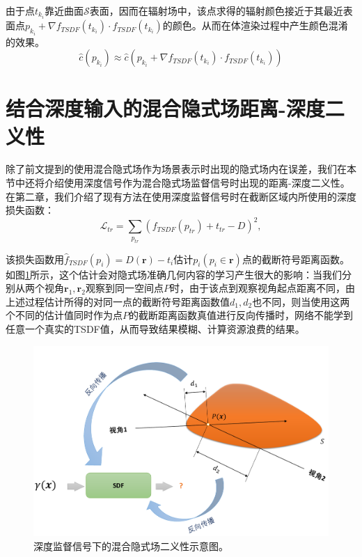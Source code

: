由于点$t_{k_i}$靠近曲面$\mathcal{S}$表面，因而在辐射场中，该点求得的辐射颜色接近于其最近表面点$p_{k_i} + \nabla f_{TSDF}(t_{k_i})\cdot f_{TSDF}(t_{k_i})$的颜色。从而在体渲染过程中产生颜色混淆的效果。
\begin{equation}
    \hat{c}(p_{k_i})\approx\hat{c}\left(p_{k_i} + \nabla f_{TSDF}(t_{k_i})\cdot f_{TSDF}(t_{k_i})\right)
\end{equation}


\section{结合深度输入的混合隐式场距离-深度二义性}
除了前文提到的使用混合隐式场作为场景表示时出现的隐式场内在误差，我们在本节中还将介绍使用深度信号作为混合隐式场监督信号时出现的距离-深度二义性。在第二章，我们介绍了现有方法\cite{azinovic_neural_2022}在使用深度监督信号时在截断区域内所使用的深度损失函数：
\begin{equation}
    \mathcal{L}_{tr} = \sum_{p_{tr}}(f_{TSDF}(p_{tr})+t_{tr}-D)^2,
\end{equation}

该损失函数用$\hat{f}_{TSDF}(p_i) = D(\mathbf{r})-t_i$估计$p_i (p_i \in \mathbf{r})$点的截断符号距离函数。如图\ref{fig:omni-nerf depth error}所示，这个估计会对隐式场准确几何内容的学习产生很大的影响：当我们分别从两个视角$\mathbf{r}_1, \mathbf{r}_2$观察到同一空间点$P$时，由于该点到观察视角起点距离不同，由上述过程估计所得的对同一点的截断符号距离函数值$d_1, d_2$也不同，则当使用这两个不同的估计值同时作为点$P$的截断距离函数真值进行反向传播时，网络不能学到任意一个真实的TSDF值，从而导致结果模糊、计算资源浪费的结果。

\begin{figure}[ht]
    \centering
    \includegraphics[width=\textwidth]{undergraduate-thesis/images/omni-nerf/omninerf-error1.pdf}
    \caption{深度监督信号下的混合隐式场二义性示意图。}
    \label{fig:omni-nerf depth error}
\end{figure}


